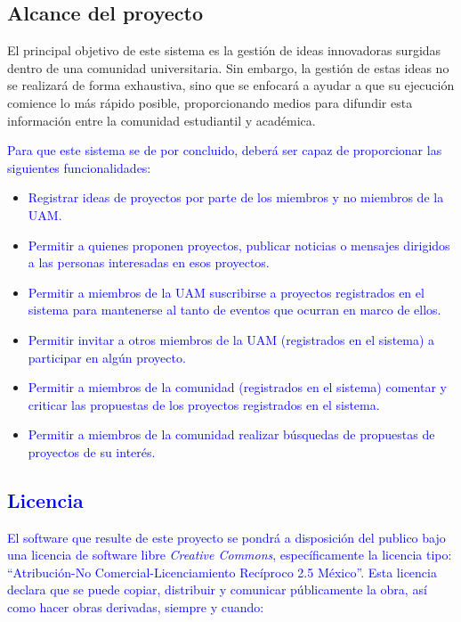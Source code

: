 \documentclass[11pt,letterpaper,titlepage]{article}
\begin{document}
\subsection{Alcance del proyecto}

El principal objetivo de este sistema es la gesti\'on de ideas innovadoras surgidas dentro de una comunidad universitaria. Sin embargo, la gesti\'on de estas ideas no se realizar\'a de forma exhaustiva, sino que se enfocar\'a a ayudar a que su ejecuci\'on comience lo m\'as r\'apido posible, proporcionando medios para difundir esta informaci\'on entre la comunidad estudiantil y acad\'emica. 

\textcolor{blue}{Para que este sistema se de por concluido, deber\'a ser capaz de proporcionar las siguientes funcionalidades:}

\begin{itemize}
 \item \textcolor{blue}{Registrar ideas de proyectos por parte de los miembros y no miembros de la UAM.}
 \item \textcolor{blue}{Permitir a quienes proponen proyectos, publicar noticias o mensajes dirigidos a las personas interesadas en esos proyectos.}
 \item \textcolor{blue}{Permitir a miembros de la UAM suscribirse a proyectos registrados en el sistema para mantenerse al tanto de eventos que ocurran en marco de ellos.}
 \item \textcolor{blue}{Permitir invitar a otros miembros de la UAM (registrados en el sistema) a participar en alg\'un proyecto.}
 \item \textcolor{blue}{Permitir a miembros de la comunidad (registrados en el sistema) comentar y criticar las propuestas de los proyectos registrados en el sistema.}
 \item \textcolor{blue}{Permitir a miembros de la comunidad realizar b\'usquedas de propuestas de proyectos de su inter\'es.}

\end{itemize}
\textcolor{blue}{
\subsection{Licencia}
El software que resulte de este proyecto se pondr\'a a disposici\'on del publico bajo una licencia de software libre \textit{Creative Commons}, espec\'ificamente la licencia tipo: ``Atribuci\'on-No Comercial-Licenciamiento Rec\'iproco 2.5 M\'exico''. Esta licencia declara que se puede copiar, distribuir y comunicar p\'ublicamente la obra, as\'i como hacer obras derivadas, siempre y cuando:}
\end{document}
